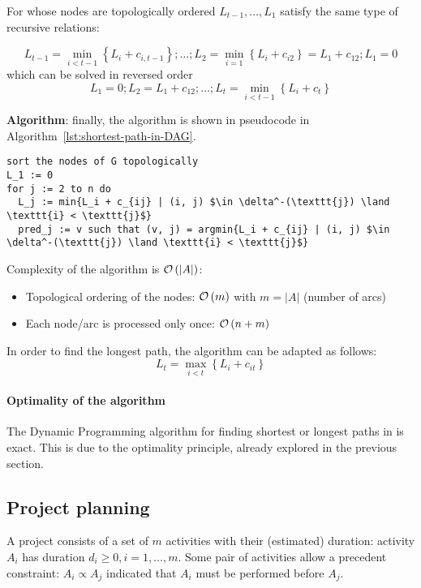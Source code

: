 \documentclass[english]{article}
\begin{document}
For \DAGs whose nodes are topologically ordered \(L_{t-1}, \ldots, L_1\) satisfy the same type of recursive relations:

\[ L_{t-1} = \displaystyle \min_{i < t-1} \left\{ L_i + c_{i, t-1} \right\}; \ldots; L_2 = \displaystyle \min_{i=1}\left\{ L_i + c_{i2} \right\} = L_1 + c_{12}; L_1 = 0 \]
which can be solved in reversed order
\[ L_1 = 0; L_2 = L_1 + c_{12}; \ldots; L_{t} = \displaystyle \min_{i < t - 1} \left\{ L_i + c_t \right\} \]

\bigskip
\textbf{Algorithm}:
finally, the algorithm is shown in pseudocode in Algorithm~\ref{lst:shortest-path-in-DAG}.

\begin{lstlisting}[style=custom, language=pseudocode, caption={Shortest path in \DAG}, label={lst:shortest-path-in-DAG}]
sort the nodes of G topologically
L_1 := 0
for j := 2 to n do
  L_j := min{L_i + c_{ij} | (i, j) $\in \delta^-(\texttt{j}) \land \texttt{i} < \texttt{j}$}
  pred_j := v such that (v, j) = argmin{L_i + c_{ij} | (i, j) $\in \delta^-(\texttt{j}) \land \texttt{i} < \texttt{j}$}
\end{lstlisting}

\bigskip
Complexity of the algorithm is \(\mathcal{O}\left(|A|\right)\):

\begin{itemize}
  \item Topological ordering of the nodes: \(\mathcal{O}\left(m\right)\) with \(m = |A|\) (number of arcs)
  \item Each node/arc is processed only once: \(\mathcal{O}\left(n+m\right)\)
\end{itemize}

\bigskip
In order to find the longest path, the algorithm can be adapted as follows:
\[L_t = \displaystyle \max_{i < t} \left\{ L_i + c_{it} \right\}\]

\paragraph{Optimality of the algorithm}

The Dynamic Programming algorithm for finding shortest or longest paths in \DAGs is exact.
This is due to the optimality principle, already explored in the previous section.

\subsection{Project planning}

A project consists of a set of \(m\) activities with their (estimated) duration: activity \(A_i\) has duration \(d_i \geq 0, i = 1, \ldots, m\).
Some pair of activities allow a precedent constraint: \(A_i \propto A_j\) indicated that \(A_i\) must be performed before \(A_j\).
\end{document}
